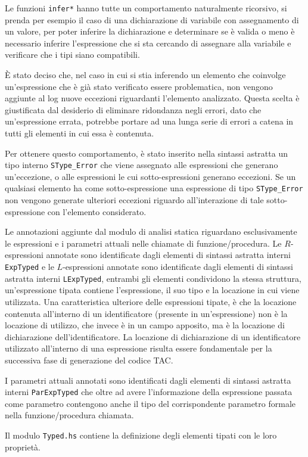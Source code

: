 Le funzioni \texttt{infer*} hanno tutte un comportamento naturalmente ricorsivo, si prenda per esempio il caso di una dichiarazione di variabile con assegnamento di un valore, per poter inferire la dichiarazione e determinare se è valida o meno è necessario inferire l'espressione che si sta cercando di assegnare alla variabile e verificare che i tipi siano compatibili.

È stato deciso che, nel caso in cui si stia inferendo un elemento che coinvolge un'espressione che è già stato verificato essere problematica, non vengono aggiunte al log nuove eccezioni riguardanti l'elemento analizzato. Questa scelta è giustificata dal desiderio di eliminare ridondanza negli errori, dato che un'espressione errata, potrebbe portare ad una lunga serie di errori a catena in tutti gli elementi in cui essa è contenuta.

Per ottenere questo comportamento, è stato inserito nella sintassi astratta un tipo interno \texttt{SType\_Error} che viene assegnato alle espressioni che generano un'eccezione, o alle espressioni le cui sotto-espressioni generano eccezioni. Se un qualsiasi elemento ha come sotto-espressione una espressione di tipo \texttt{SType\_Error} non vengono generate ulteriori eccezioni riguardo all'interazione di tale sotto-espressione con l'elemento considerato.

Le annotazioni aggiunte dal modulo di analisi statica riguardano esclusivamente le espressioni e i parametri attuali nelle chiamate di funzione/procedura. Le $R$-espressioni annotate sono identificate dagli elementi di sintassi astratta interni \texttt{ExpTyped} e le $L$-espressioni annotate sono identificate dagli elementi di sintassi astratta interni \texttt{LExpTyped}, entrambi gli elementi condividono la stessa struttura, un'espressione tipata contiene l'espressione, il suo tipo e la locazione in cui viene utilizzata. Una caratteristica ulteriore delle espressioni tipate, è che la locazione contenuta all'interno di un identificatore (presente in un'espressione) non è la locazione di utilizzo, che invece è in un campo apposito, ma è la locazione di dichiarazione dell'identificatore.
La locazione di dichiarazione di un identificatore utilizzato all'interno di una espressione risulta essere fondamentale per la successiva fase di generazione del codice TAC.

I parametri attuali annotati sono identificati dagli elementi di sintassi astratta interni \texttt{ParExpTyped} che oltre ad avere l'informazione della espressione passata come parametro contengono anche il tipo del corrispondente parametro formale nella funzione/procedura chiamata.

Il modulo \texttt{Typed.hs} contiene la definizione degli elementi tipati con le loro proprietà.



